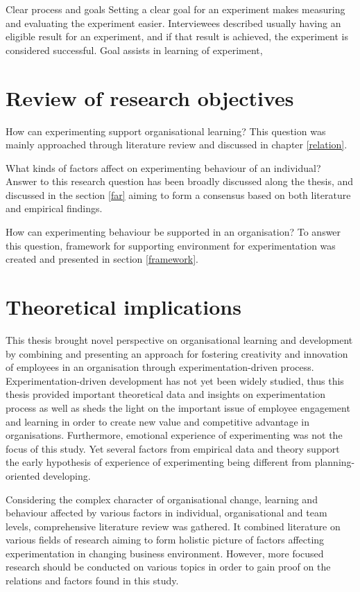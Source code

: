 Clear process and goals
Setting a clear goal for an experiment makes measuring and evaluating the experiment easier. Interviewees described usually having an eligible result for an experiment, and if that result is achieved, the experiment is considered successful. Goal assists in learning of experiment, 

\section{Review of research objectives}

How can experimenting support organisational learning? 
This question was mainly approached through literature review and discussed in chapter \ref{relation}. 

What kinds of factors affect on experimenting behaviour of an individual?
Answer to this research question has been broadly discussed along the thesis, and discussed in the section \ref{far} aiming to form a consensus based on both literature and empirical findings. 

How can experimenting behaviour be supported in an organisation? 
To answer this question, framework for supporting environment for experimentation was created and presented in section \ref{framework}. 

\section{Theoretical implications}
This thesis brought novel perspective on organisational learning and development by combining and presenting an approach for fostering creativity and innovation of employees in an organisation through experimentation-driven process. 
Experimentation-driven development has not yet been widely studied, thus this thesis provided important theoretical data and insights on experimentation process as well as sheds the light on the important issue of employee engagement and learning in order to create new value and competitive advantage in organisations. Furthermore, emotional experience of experimenting was not the focus of this study. Yet several factors from empirical data and theory support the early hypothesis of experience of experimenting being different from planning-oriented developing. 

Considering the complex character of organisational change, learning and behaviour affected by various factors in individual, organisational and team levels, comprehensive literature review was gathered. It combined literature on various fields of research aiming to form holistic picture of factors affecting experimentation in changing business environment. However, more focused research should be conducted on various topics in order to gain proof on the relations and factors found in this study. 

